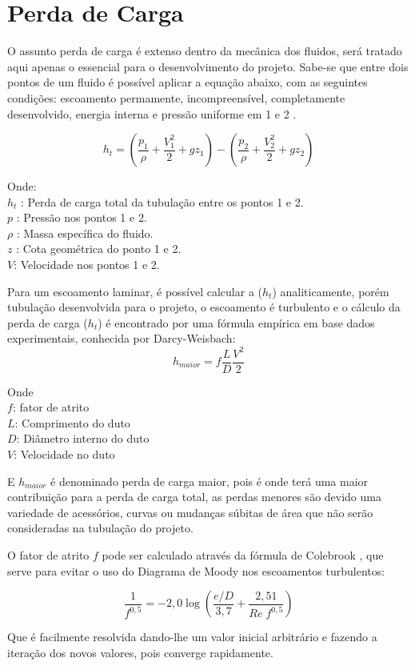 \section{Perda de Carga}

    O assunto perda de carga é extenso dentro da mecânica dos fluidos, será tratado aqui apenas o essencial para o desenvolvimento do projeto. Sabe-se que entre dois pontos de um fluido é possível aplicar a equação abaixo, com as seguintes condições: escoamento permamente, incompreensível, completamente desenvolvido, energia interna e pressão uniforme em 1 e 2 \cite{fox}.

    \begin{equation} \label{eq-perda_de_carga}
        h_t = \left( \frac{p_1}{\rho} + \frac{V^2_1}{2} + gz_1 \right)- \left( \frac{p_2}{\rho} + \frac{V^2_2}{2} + gz_2 \right)
    \end{equation}

\noindent
    Onde: \\
    $h_t$ : Perda de carga total da tubulação entre os pontos 1 e 2. \\
    $p$   : Pressão nos pontos 1 e 2. \\
    $\rho$ : Massa específica do fluido. \\
    $z$ : Cota geométrica do ponto 1 e 2. \\
    $V$: Velocidade nos pontos 1 e 2.


    Para um escoamento laminar, é possível calcular a ($h_t$) analiticamente, porém tubulação desenvolvida para o projeto, o escoamento é turbulento e o cálculo da perda de carga ($h_t$) é encontrado por uma fórmula empírica em base dados experimentais, conhecida por Darcy-Weisbach:
    \begin{equation} \label{eq-darcy}
        h_{maior} = f \frac{L}{D} \frac{V^2}{2}
    \end{equation}

    \noindent
    Onde \\
    $f$: fator de atrito \\
    $L$: Comprimento do duto \\
    $D$: Diâmetro interno do duto \\
    $V$: Velocidade no duto

    E $h_{maior}$ é denominado perda de carga maior, pois é onde terá uma maior contribuição para a perda de carga total, as perdas menores são devido uma variedade de acessórios, curvas ou mudanças súbitas de área \cite{fox} que não serão consideradas na tubulação do projeto.

    O fator de atrito $f$ pode ser calculado através da fórmula de Colebrook \cite{fox}, que serve para evitar o uso do Diagrama de Moody nos escoamentos turbulentos:

    \begin{equation} \label{eq-colebrook}
    \frac{1}{f^{0,5}} = -2,0 \log \left( \frac{e/D}{3,7} + \frac{2,51}{Re\;f^{0,5}} \right)
    \end{equation}

    Que é facilmente resolvida dando-lhe um valor inicial arbitrário  e fazendo a iteração dos novos valores, pois converge rapidamente.
